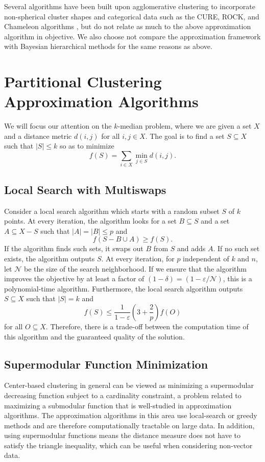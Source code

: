 \documentclass{article}
\begin{document}
Several algorithms have been built upon agglomerative clustering to incorporate non-spherical cluster shapes and categorical data such as the CURE, ROCK, and Chameleon algorithms \cite{Guha_CURE, Guha_ROCK, Karypis}, but do not relate as much to the above approximation algorithm in objective. We also choose not compare the approximation framework with Bayesian hierarchical methods for the same reasons as above. 

\section{Partitional Clustering Approximation Algorithms}

We will focus our attention on the $k$-median problem, where we are given a set $X$ and a distance metric $d(i,j)$ for all $i,j \in X$. The goal is to find a set $S \subseteq X$ such that $|S| \leq k$ so as to minimize 
\[ f(S) = \sum_{ i\in X} \min_{j \in S} d(i,j). \]

\subsection{Local Search with Multiswaps}
Consider a local search algorithm which starts with a random subset $S$ of $k$ points. At every iteration, the algorithm looks for a set $B \subseteq S$ and a set $A \subseteq X -S$ such that $|A| = |B| \leq p$ and
\[ f(S- B \cup A) \geq f(S). \]
If the algorithm finds such sets, it swaps out $B$ from $S$ and adds $A$. If no such set exists, the algorithm outputs $S$. At every iteration, for $p$ independent of $k$ and $n$, let $\mathcal{N}$ be the size of the search neighborhood. If we ensure that the algorithm improves the objective by at least a factor of $(1- \delta) = (1- \varepsilon/\mathcal{N})$, this is a polynomial-time algorithm. Furthermore, the local search algorithm outputs $S \subseteq X$ such that $|S| = k$ and
\[ f(S) \leq \frac{1}{1-\varepsilon} \left (3 + \frac{2}{p} \right ) f(O) \]
for all $O \subseteq X$. Therefore, there is a trade-off between the computation time of this algorithm and the guaranteed quality of the solution. 

\subsection{Supermodular Function Minimization}
Center-based clustering in general can be viewed as minimizing a supermodular decreasing function subject to a cardinality constraint, a problem related to maximizing a submodular function that is well-studied in approximation algorithms. The approximation algorithms in this area use local-search or greedy methods and are therefore computationally tractable on large data. In addition, using supermodular functions means the distance measure does not have to satisfy the triangle inequality, which can be useful when considering non-vector data.
\end{document}
